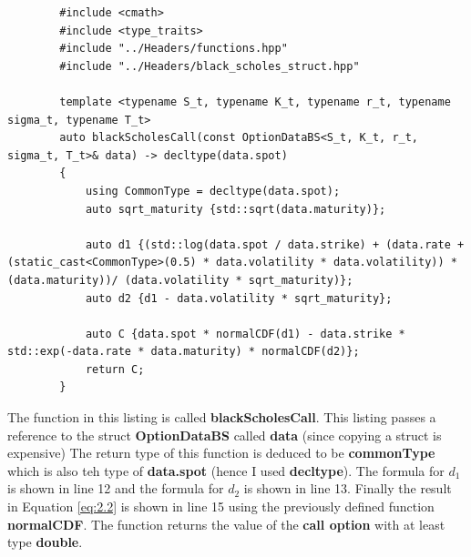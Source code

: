 \documentclass[12pt]{article}
\numberwithin{equation}{section}
\begin{document}
 \newpage
\begin{listing}[ht]
	\begin{verbatim}
		#include <cmath>
		#include <type_traits>
		#include "../Headers/functions.hpp"
		#include "../Headers/black_scholes_struct.hpp"
		
		template <typename S_t, typename K_t, typename r_t, typename sigma_t, typename T_t>
		auto blackScholesCall(const OptionDataBS<S_t, K_t, r_t, sigma_t, T_t>& data) -> decltype(data.spot)
		{
			using CommonType = decltype(data.spot);
			auto sqrt_maturity {std::sqrt(data.maturity)};
			
			auto d1 {(std::log(data.spot / data.strike) + (data.rate + (static_cast<CommonType>(0.5) * data.volatility * data.volatility)) * (data.maturity))/ (data.volatility * sqrt_maturity)};
			auto d2 {d1 - data.volatility * sqrt_maturity};
			
			auto C {data.spot * normalCDF(d1) - data.strike * std::exp(-data.rate * data.maturity) * normalCDF(d2)};
			return C;
		}
	\end{verbatim}
	\caption{Black Scholes Call using Closed Form Solution}
	\label{blackscholesCFcall}
\end{listing}
 The function in this listing is called \textbf{blackScholesCall}. This listing passes a reference to the struct \textbf{OptionDataBS} called \textbf{data} (since copying a struct is expensive)  The return type of this function is deduced to be \textbf{commonType} which is also teh type of \textbf{data.spot} (hence I used \textbf{decltype}). The formula for $d_1$ is shown in line 12 and the formula for $d_2$ is shown in line 13.  Finally the result in Equation \ref{eq:2.2} is shown in line 15 using the previously defined function \textbf{normalCDF}. The function returns the value of the \textbf{call option} with at least type \textbf{double}. 
\newpage
\end{document}

